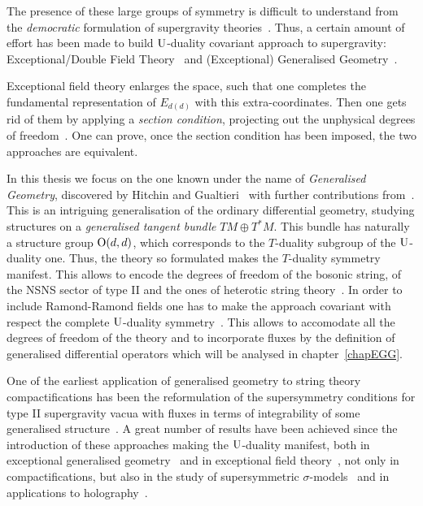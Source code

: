 \documentclass[draft]{phd}
\begin{document}
			The presence of these large groups of symmetry is difficult to understand from the \emph{democratic} formulation of supergravity theories~\cite{DemSugra}.
			Thus, a certain amount of effort has been made to build $\mathrm{U}$-duality covariant approach to supergravity: Exceptional/Double Field Theory~\cite{hull2, samt1, samt2} and (Exceptional) Generalised Geometry~\cite{Gualtieri:2003dx, hull1, waldram1, waldram2, waldram3, waldram4}.
			
			Exceptional field theory enlarges the space, such that one completes the fundamental representation of $E_{d(d)}$ with this extra-coordinates.
			Then one gets rid of them by applying a \emph{section condition}, projecting out the unphysical degrees of freedom~\cite{samt1, samt2}.
			One can prove, once the section condition has been imposed, the two approaches are equivalent.
			
			In this thesis we focus on the one known under the name of \emph{Generalised Geometry}, discovered by Hitchin and Gualtieri~\cite{Gualtieri:2003dx, Hitchin:2004ut} with further contributions from~\cite{Cavalcanti1, Cavalcanti2, WittTh, Gualtieri2007}.
			This is an intriguing generalisation of the ordinary differential geometry, studying structures on a \emph{generalised tangent bundle} $TM \oplus T^*M$.
			This bundle has naturally a structure group $\mathrm{O}(d,d)$, which corresponds to the $T$-duality subgroup of the $\mathrm{U}$-duality one.
			Thus, the theory so formulated makes the $T$-duality symmetry manifest.
			This allows to encode the degrees of freedom of the bosonic string, of the NSNS sector of type II and  the ones of heterotic string theory~\cite{waldram1, waldram2, RubenDan}.
			In order to include Ramond-Ramond fields one has to make the approach covariant with respect the complete $\mathrm{U}$-duality symmetry~\cite{hull1, waldram4}.
			This allows to accomodate all the degrees of freedom of the theory and to incorporate fluxes by the definition of generalised differential operators which will be analysed in chapter~\ref{chapEGG}.
			
			One of the earliest application of generalised geometry to string theory compactifications has been the reformulation of the supersymmetry conditions for type II supergravity vacua with fluxes in terms of integrability of some generalised structure~\cite{petrini1, petrini2}.
			A great number of results have been achieved since the introduction of these approaches making the $\mathrm{U}$-duality manifest, both in exceptional generalised geometry~\cite{papersEGG} and in exceptional field theory~\cite{papersEFT}, not only in compactifications, but also in the study of supersymmetric $\sigma$-models~\cite{RubenTom, RubenDan, ZabzineReview} and in applications to holography~\cite{petrini4, AshmoreDef}.
			
\end{document}
